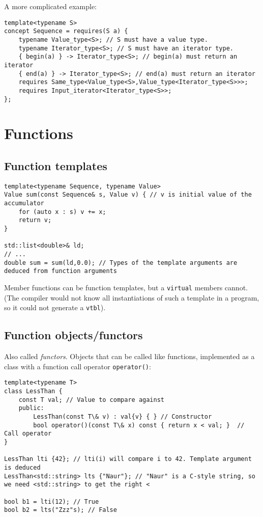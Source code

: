 \documentclass[8pt, table, xcdraw]{article}%
\begin{document}
A more complicated example:

\begin{lstlisting}
template<typename S>
concept Sequence = requires(S a) {
    typename Value_type<S>; // S must have a value type.
    typename Iterator_type<S>; // S must have an iterator type.
    { begin(a) } -> Iterator_type<S>; // begin(a) must return an iterator
    { end(a) } -> Iterator_type<S>; // end(a) must return an iterator
    requires Same_type<Value_type<S>,Value_type<Iterator_type<S>>>;
    requires Input_iterator<Iterator_type<S>>;
};
\end{lstlisting}

\section{Functions}

\subsection{Function templates}

\begin{lstlisting}
template<typename Sequence, typename Value>
Value sum(const Sequence& s, Value v) { // v is initial value of the accumulator
    for (auto x : s) v += x;
    return v;
}

std::list<double>& ld;
// ...
double sum = sum(ld,0.0); // Types of the template arguments are deduced from function arguments
\end{lstlisting}

Member functions can be function templates, but a \lstinline{virtual} members cannot. (The compiler would not know all instantiations of such a template in a program, so it could not generate a \lstinline{vtbl}).

\subsection{Function objects/functors} \label{functors}

Also called \textit{functors}. Objects that can be called like functions, implemented as a class with a function call operator \lstinline{operator()}:

\begin{lstlisting}
template<typename T>
class LessThan {
    const T val; // Value to compare against
    public:
        LessThan(const T\& v) : val{v} { } // Constructor
        bool operator()(const T\& x) const { return x < val; }  // Call operator
}

LessThan lti {42}; // lti(i) will compare i to 42. Template argument is deduced
LessThan<std::string> lts {"Naur"}; // "Naur" is a C-style string, so we need <std::string> to get the right <

bool b1 = lti(12); // True
bool b2 = lts("Zzz"s); // False
\end{lstlisting}
\end{document}

